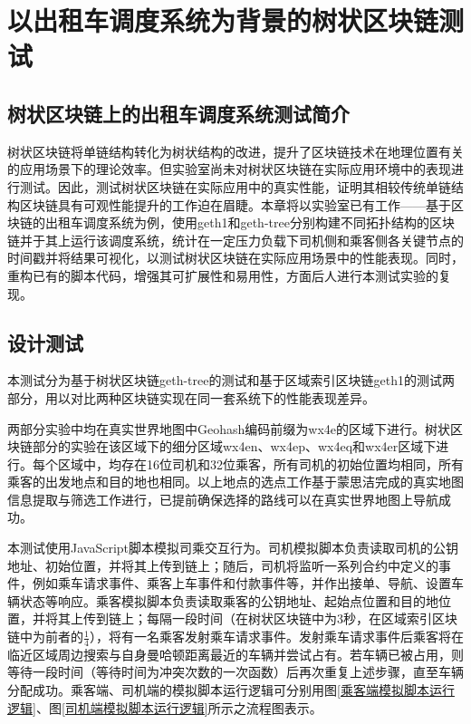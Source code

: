 %
%
%
%
%

\chapter{以出租车调度系统为背景的树状区块链测试}

\section{树状区块链上的出租车调度系统测试简介}

树状区块链将单链结构转化为树状结构的改进，提升了区块链技术在地理位置有关的应用场景下的理论效率。但实验室尚未对树状区块链在实际应用环境中的表现进行测试。因此，测试树状区块链在实际应用中的真实性能，证明其相较传统单链结构区块链具有可观性能提升的工作迫在眉睫。本章将以实验室已有工作——基于区块链的出租车调度系统为例，使用geth1和geth-tree分别构建不同拓扑结构的区块链并于其上运行该调度系统，统计在一定压力负载下司机侧和乘客侧各关键节点的时间戳并将结果可视化，以测试树状区块链在实际应用场景中的性能表现。同时，重构已有的脚本代码，增强其可扩展性和易用性，方面后人进行本测试实验的复现。

\section{设计测试}

本测试分为基于树状区块链geth-tree的测试和基于区域索引区块链geth1的测试两部分，用以对比两种区块链实现在同一套系统下的性能表现差异。

两部分实验中均在真实世界地图中Geohash编码前缀为wx4e的区域下进行。树状区块链部分的实验在该区域下的细分区域wx4en、wx4ep、wx4eq和wx4er区域下进行。每个区域中，均存在16位司机和32位乘客，所有司机的初始位置均相同，所有乘客的出发地点和目的地也相同。以上地点的选点工作基于蒙思洁完成的真实地图信息提取与筛选工作进行，已提前确保选择的路线可以在真实世界地图上导航成功。

本测试使用JavaScript脚本模拟司乘交互行为。司机模拟脚本负责读取司机的公钥地址、初始位置，并将其上传到链上；随后，司机将监听一系列合约中定义的事件，例如乘车请求事件、乘客上车事件和付款事件等，并作出接单、导航、设置车辆状态等响应。乘客模拟脚本负责读取乘客的公钥地址、起始点位置和目的地位置，并将其上传到链上；每隔一段时间（在树状区块链中为3秒，在区域索引区块链中为前者的$\frac14$），将有一名乘客发射乘车请求事件。发射乘车请求事件后乘客将在临近区域周边搜索与自身曼哈顿距离最近的车辆并尝试占有。若车辆已被占用，则等待一段时间（等待时间为冲突次数的一次函数）后再次重复上述步骤，直至车辆分配成功。乘客端、司机端的模拟脚本运行逻辑可分别用图\ref{乘客端模拟脚本运行逻辑}、图\ref{司机端模拟脚本运行逻辑}所示之流程图表示。

